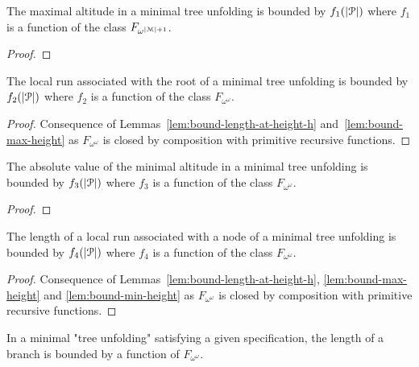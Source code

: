 \begin{lemma}
	\label{lem:bound-max-height}
	The maximal altitude in a minimal tree unfolding is bounded by $f_1(|\mathcal{P}|)$ where $f_1$ is a function of the class $F_{\omega^{|\mathcal{M}| +1}}$.
\end{lemma}

\ifproofs
\begin{proof}
\end{proof}
\fi

\begin{corollary}
	The local run associated with the root of a minimal tree unfolding is bounded by $f_2(|\mathcal{P}|)$ where $f_2$ is a function of the class $F_{\omega^\omega}$.
\end{corollary}

\ifproofs
\begin{proof}
	Consequence of Lemmas~\ref{lem:bound-length-at-height-h} and~\ref{lem:bound-max-height} as $F_{\omega^\omega}$ is closed by composition with primitive recursive functions.
\end{proof}
\fi

\begin{lemma}
	\label{lem:bound-min-height}
	The absolute value of the minimal altitude in a minimal tree unfolding is bounded by $f_3(|\mathcal{P}|)$ where $f_3$ is a function of the class $F_{\omega^\omega}$.
\end{lemma}

\ifproofs
\begin{proof}
\end{proof}
\fi


\begin{corollary}
	\label{lem:bound-node-size}
	The length of a local run associated with a node of a minimal tree unfolding is bounded by $f_4(|\mathcal{P}|)$ where $f_4$ is a function of the class $F_{\omega^\omega}$.
\end{corollary}

\ifproofs
\begin{proof}
	Consequence of Lemmas~\ref{lem:bound-length-at-height-h}, \ref{lem:bound-max-height} and \ref{lem:bound-min-height} as $F_{\omega^\omega}$ is closed by composition with primitive recursive functions.
\end{proof}
\fi


\begin{proposition}
	In a minimal "tree unfolding" satisfying a given specification, the length of a branch is bounded by a function of $F_{\omega^\omega}$.
\end{proposition}

